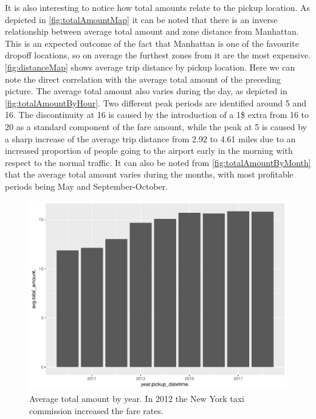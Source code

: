 \documentclass{acm_proc_article-sp-sigmod09}
\begin{document}
It is also interesting to notice how total amounts relate to the pickup location. As depicted in \cref{fig:totalAmountMap} it can be noted that there is an inverse relationship between average total amount and zone distance from Manhattan. This is an expected outcome of the fact that Manhattan is one of the favourite dropoff locations, so on average the furthest zones from it are the most expensive. \cref{fig:distanceMap} shows average trip distance by pickup location. Here we can note the direct correlation with the average total amount of the preceding picture. The average total amount also varies during the day, as depicted in \cref{fig:totalAmountByHour}. Two different peak periods are identified around 5 and 16. The discontinuity at 16 is caused by the introduction of a 1\$ extra from 16 to 20 as a standard component of the fare amount, while the peak at 5 is caused by a sharp increase of the average trip distance from 2.92 to 4.61 miles due to an increased proportion of people going to the airport early in the morning with respect to the normal traffic. It can also be noted from \cref{fig:totalAmountByMonth} that the average total amount varies during the months, with most profitable periods being May and September-October.

\begin{figure}
	\centering
	\includegraphics[width=1\columnwidth]{resources/base_plots/avg_total_amount_by_year.pdf}
	\caption{Average total amount by year. In 2012 the New York taxi commission increased the fare rates.}
	\label{fig:totalAmountByYear}
\end{figure}
\end{document}
